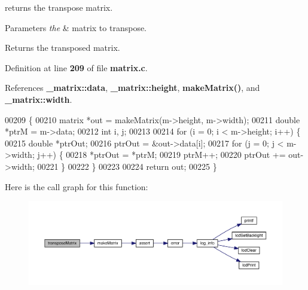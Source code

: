 returns the transpose matrix. 


\begin{DoxyParams}{Parameters}
{\em the} & matrix to transpose. \\
\hline
\end{DoxyParams}
\begin{DoxyReturn}{Returns}
the transposed matrix. 
\end{DoxyReturn}


Definition at line \textbf{ 209} of file \textbf{ matrix.\+c}.



References \textbf{ \+\_\+matrix\+::data}, \textbf{ \+\_\+matrix\+::height}, \textbf{ make\+Matrix()}, and \textbf{ \+\_\+matrix\+::width}.


\begin{DoxyCode}
00209                                    \{
00210   matrix *out = makeMatrix(m->height, m->width);
00211   \textcolor{keywordtype}{double} *ptrM = m->data;
00212   \textcolor{keywordtype}{int} i, j;
00213 
00214   \textcolor{keywordflow}{for} (i = 0; i < m->height; i++) \{
00215     \textcolor{keywordtype}{double} *ptrOut;
00216     ptrOut = &out->data[i];
00217     \textcolor{keywordflow}{for} (j = 0; j < m->width; j++) \{
00218       *ptrOut = *ptrM;
00219       ptrM++;
00220       ptrOut += out->width;
00221     \}
00222   \}
00223 
00224   \textcolor{keywordflow}{return} out;
00225 \}
\end{DoxyCode}
Here is the call graph for this function\+:
\nopagebreak
\begin{figure}[H]
\begin{center}
\leavevmode
\includegraphics[width=350pt]{matrix_8h_a2936260302742748b0639e8ec71d4d9f_cgraph}
\end{center}
\end{figure}
